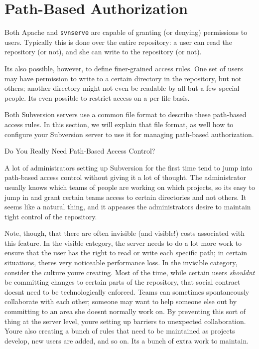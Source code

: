 \section{Path-Based
Authorization}\label{svn.serverconfig.pathbasedauthz}

Both Apache and \texttt{svnserve} are capable of granting (or denying)
permissions to users. Typically this is done over the entire repository:
a user can read the repository (or not), and she can write to the
repository (or not).

It\textquotesingle s also possible, however, to define finer-grained
access rules. One set of users may have permission to write to a certain
directory in the repository, but not others; another directory might not
even be readable by all but a few special people. It\textquotesingle s
even possible to restrict access on a per file basis.

Both Subversion servers use a common file format to describe these
path-based access rules. In this section, we will explain that file
format, as well how to configure your Subversion server to use it for
managing path-based authorization.

Do You Really Need Path-Based Access Control?

A lot of administrators setting up Subversion for the first time tend to
jump into path-based access control without giving it a lot of thought.
The administrator usually knows which teams of people are working on
which projects, so it\textquotesingle s easy to jump in and grant
certain teams access to certain directories and not others. It seems
like a natural thing, and it appeases the
administrator\textquotesingle s desire to maintain tight control of the
repository.

Note, though, that there are often invisible (and visible!) costs
associated with this feature. In the visible category, the server needs
to do a lot more work to ensure that the user has the right to read or
write each specific path; in certain situations, there\textquotesingle s
very noticeable performance loss. In the invisible category, consider
the culture you\textquotesingle re creating. Most of the time, while
certain users \emph{shouldn\textquotesingle t} be committing changes to
certain parts of the repository, that social contract
doesn\textquotesingle t need to be technologically enforced. Teams can
sometimes spontaneously collaborate with each other; someone may want to
help someone else out by committing to an area she
doesn\textquotesingle t normally work on. By preventing this sort of
thing at the server level, you\textquotesingle re setting up barriers to
unexpected collaboration. You\textquotesingle re also creating a bunch
of rules that need to be maintained as projects develop, new users are
added, and so on. It\textquotesingle s a bunch of extra work to
maintain.

